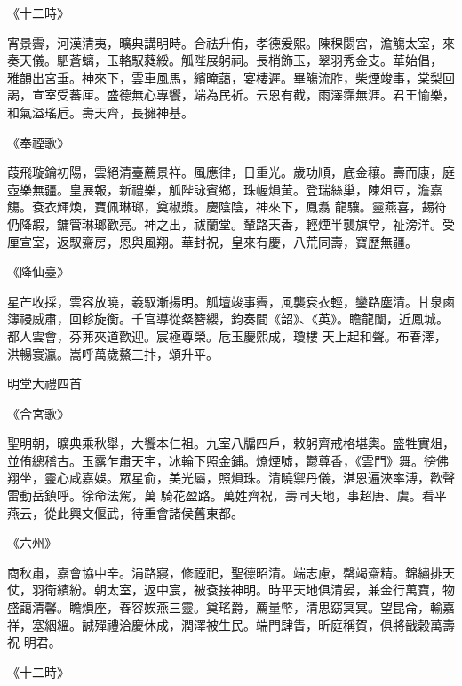 \begin{pinyinscope}
 《十二時》



 宵景霽，河漢清夷，曠典講明時。合祛升侑，孝德爰熙。陳稞閟宮，澹觴太室，來奏天儀。駟蒼螭，玉輅馭蕤綏。觚陛展躬祠。長梢飾玉，翠羽秀金支。華始倡，
 雅韻出宮垂。神來下，雲車風馬，繽晻藹，宴棲遲。畢觴流胙，柴煙竣事，棠梨回謁，宣室受蕃厘。盛德無心專饗，端為民祈。云恩有截，雨澤霈無涯。君王愉樂，和氣溢瑤卮。壽天齊，長擁神基。



 《奉禋歌》



 葭飛璇鑰初陽，雲絕清臺薦景祥。風應律，日重光。歲功順，底金穰。壽而康，庭壺樂無疆。皇展報，新禮樂，觚陛詠賓鄉，珠幄熉黃。登瑞絲巢，陳俎豆，澹嘉觴。袞衣輝煥，寶佩琳瑯，奠椒漿。慶陰陰，神來下，鳳翥
 龍驤。靈燕喜，錫符仍降嘏，鏞管琳瑯歡亮。神之出，祓蘭堂。輦路天香，輕煙半襲旗常，祉滂洋。受厘宣室，返馭齋房，恩與風翔。華封祝，皇來有慶，八荒同壽，寶歷無疆。



 《降仙臺》



 星芒收採，雲容放曉，羲馭漸揚明。觚壇竣事霽，風襲袞衣輕，鑾路塵清。甘泉鹵簿祲威肅，回軫旋衡。千官導從粲簪纓，鈞奏間《韶》、《英》。瞻龍闈，近鳳城。都人雲會，芬茀夾道歡迎。宸極尊榮。卮玉慶熙成，瓊樓
 天上起和聲。布春澤，洪暢寰瀛。嵩呼萬歲鰲三抃，頌升平。



 明堂大禮四首



 《合宮歌》



 聖明朝，曠典乘秋舉，大饗本仁祖。九室八牖四戶，敕躬齊戒格堪輿。盛牲實俎，並侑總稽古。玉露乍肅天宇，冰輪下照金鋪。燎煙噓，鬱尊香，《雲門》舞。徬佛翔坐，靈心咸嘉娛。眾星俞，美光屬，照熉珠。清曉禦丹儀，湛恩遍浹率溥，歡聲雷動岳鎮呼。徐命法駕，萬
 騎花盈路。萬姓齊祝，壽同天地，事超唐、虞。看平燕云，從此興文偃武，待重會諸侯舊東都。



 《六州》



 商秋肅，嘉會協中辛。涓路寢，修禋祀，聖德昭清。端志慮，罄竭齋精。錦繡排天仗，羽衛繽紛。朝太室，返中宸，被袞接神明。時平天地俱清晏，兼金行萬寶，物盛藹清馨。瞻熉座，舂容娭燕三靈。奠瑤爵，薦量幣，清思窈冥冥。望昆侖，輸嘉祥，塞絪縕。誠殫禮洽慶休成，潤澤被生民。端門肆眚，昕庭稱賀，俱將戩穀萬壽祝
 明君。



 《十二時》




\end{pinyinscope}
